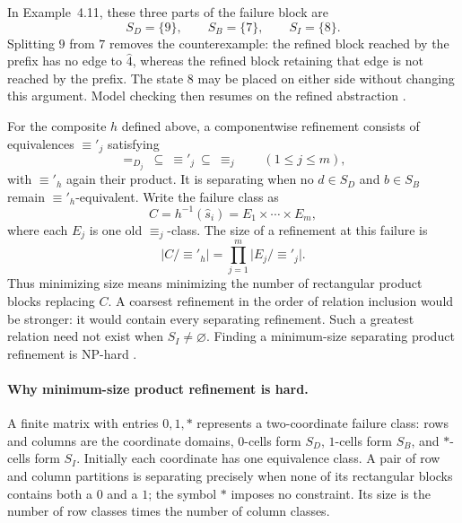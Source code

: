 In Example~4.11, these three parts of the failure block are
\[
 S_D=\{9\},\qquad S_B=\{7\},\qquad S_I=\{8\}.
\]
Splitting \(9\) from \(7\) removes the counterexample: the refined block reached
by the prefix has no edge to \(\widehat4\), whereas the refined block retaining
that edge is not reached by the prefix.  The state \(8\) may be placed on
either side without changing this argument.  Model checking then resumes on
the refined abstraction \cite[ex.~4.15 and \S4.4]{ClarkeEtAl2003}.

For the composite \(h\) defined above, a componentwise refinement consists of
equivalences \(\equiv'_j\) satisfying
\[
 =_{D_j}\ \subseteq\ \equiv'_j\ \subseteq\ \equiv_j
 \qquad(1\le j\le m),
\]
with \(\equiv'_h\) again their product. It is separating when no
\(d\in S_D\) and \(b\in S_B\) remain \(\equiv'_h\)-equivalent. Write the
failure class as
\[
 C=h^{-1}(\widehat s_i)=E_1\times\cdots\times E_m,
\]
where each \(E_j\) is one old \(\equiv_j\)-class. The size of a refinement
at this failure is
\[
 \bigl|C/{\equiv'_h}\bigr|
   =\prod_{j=1}^{m}\bigl|E_j/{\equiv'_j}\bigr|.
\]
Thus minimizing size means minimizing the number of rectangular product
blocks replacing \(C\). A coarsest refinement in the order of relation
inclusion would be stronger: it would contain every separating refinement.
Such a greatest relation need not exist when \(S_I\ne\varnothing\).
Finding a minimum-size separating product refinement is NP-hard
\cite[thm.~4.17 and \S5]{ClarkeEtAl2003}.

\paragraph{Why minimum-size product refinement is hard.}
A finite matrix with entries \(0,1,*\) represents a two-coordinate failure
class: rows and columns are the coordinate domains, \(0\)-cells form \(S_D\),
\(1\)-cells form \(S_B\), and \(*\)-cells form \(S_I\). Initially each
coordinate has one equivalence class. A pair of row and column partitions
is separating precisely when none of its rectangular blocks contains both
a \(0\) and a \(1\); the symbol \(*\) imposes no constraint. Its size is
the number of row classes times the number of column classes.

